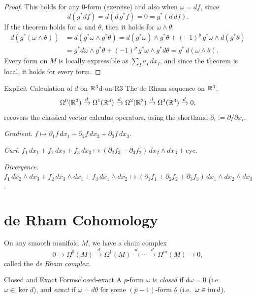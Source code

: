 \begin{proof}
    This holds for any $0$-form (exercise) and also when $\omega = df$, since
    \[
        d(g^* df) = d(d\, g^* f) = 0 = g^*(d\, df).
    \]
    If the theorem holds for $\omega$ and $\theta$, then it holds for $\omega \wedge \theta$:
    \begin{align*}
        d(g^*(\omega \wedge \theta)) &= d(g^*\omega \wedge g^*\theta) = d(g^*\omega) \wedge g^*\theta + (-1)^p\, g^*\omega \wedge d(g^*\theta) \\
        &= g^* d\omega \wedge g^*\theta + (-1)^p\, g^*\omega \wedge g^* d\theta = g^*\, d(\omega \wedge \theta).
    \end{align*}
    Every form on $M$ is locally expressible as $\sum_I a_I\, dx_I$, and since the theorem is local, it holds for every form.
\end{proof}

\begin{example}{Explicit Calculation of $d$ on $\mathbb{R}^3$}{d-on-R3}
    The de Rham sequence on $\mathbb{R}^3$,
    \[
        \Omega^0(\mathbb{R}^3) \xrightarrow{d} \Omega^1(\mathbb{R}^3) \xrightarrow{d} \Omega^2(\mathbb{R}^3) \xrightarrow{d} \Omega^3(\mathbb{R}^3) \xrightarrow{d} 0,
    \]
    recovers the classical vector calculus operators, using the shorthand $\partial_i := \partial/\partial x_i$.

    \emph{Gradient.} \quad $f \mapsto \partial_1 f\, dx_1 + \partial_2 f\, dx_2 + \partial_3 f\, dx_3$.

    \emph{Curl.} \quad $f_1\, dx_1 + f_2\, dx_2 + f_3\, dx_3 \mapsto (\partial_2 f_3 - \partial_3 f_2)\, dx_2 \wedge dx_3 + \text{cyc.}$

    \emph{Divergence.} \quad $f_1\, dx_2 \wedge dx_3 + f_2\, dx_3 \wedge dx_1 + f_3\, dx_1 \wedge dx_2 \mapsto (\partial_1 f_1 + \partial_2 f_2 + \partial_3 f_3)\, dx_1 \wedge dx_2 \wedge dx_3$.
\end{example}

\section{de Rham Cohomology}

On any smooth manifold $M$, we have a chain complex
\[
    0 \to \Omega^0(M) \xrightarrow{d} \Omega^1(M) \xrightarrow{d} \cdots \xrightarrow{d} \Omega^m(M) \to 0,
\]
called the \emph{de Rham complex}.

\begin{definition}{Closed and Exact Forms}{closed-exact}
    A $p$-form $\omega$ is \emph{closed} if $d\omega = 0$ (i.e.\ $\omega \in \ker d$), and \emph{exact} if $\omega = d\theta$ for some $(p-1)$-form $\theta$ (i.e.\ $\omega \in \operatorname{im} d$).
\end{definition}

